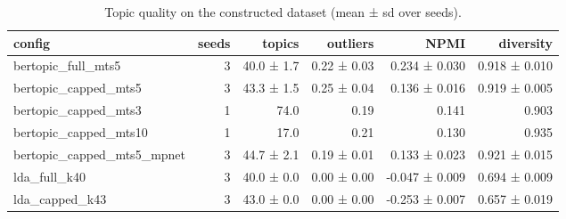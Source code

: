 \begin{table}[t]
\centering
\small
\begin{tabular}{lrrrrr}
\hline
config & seeds & topics & outliers & NPMI & diversity \\
\hline
bertopic\_full\_mts5 & 3 & 40.0 ± 1.7 & 0.22 ± 0.03 & 0.234 ± 0.030 & 0.918 ± 0.010 \\
bertopic\_capped\_mts5 & 3 & 43.3 ± 1.5 & 0.25 ± 0.04 & 0.136 ± 0.016 & 0.919 ± 0.005 \\
bertopic\_capped\_mts3 & 1 & 74.0 & 0.19 & 0.141 & 0.903 \\
bertopic\_capped\_mts10 & 1 & 17.0 & 0.21 & 0.130 & 0.935 \\
bertopic\_capped\_mts5\_mpnet & 3 & 44.7 ± 2.1 & 0.19 ± 0.01 & 0.133 ± 0.023 & 0.921 ± 0.015 \\
lda\_full\_k40 & 3 & 40.0 ± 0.0 & 0.00 ± 0.00 & -0.047 ± 0.009 & 0.694 ± 0.009 \\
lda\_capped\_k43 & 3 & 43.0 ± 0.0 & 0.00 ± 0.00 & -0.253 ± 0.007 & 0.657 ± 0.019 \\
\hline
\end{tabular}
\caption{Topic quality on the constructed dataset (mean ± sd over seeds).}
\label{tab:v2quality}
\end{table}
